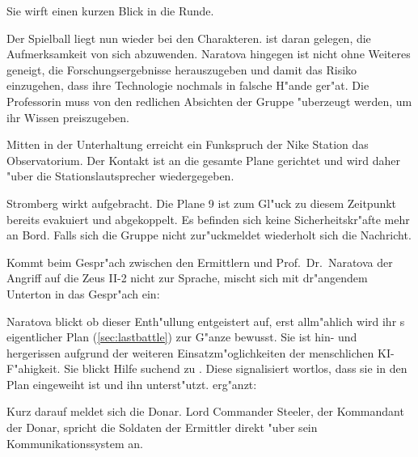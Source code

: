 Sie wirft einen kurzen Blick in die Runde.


Der Spielball liegt nun wieder bei den Charakteren. \xl{} ist daran gelegen, die Aufmerksamkeit von sich abzuwenden. Naratova hingegen ist nicht ohne Weiteres geneigt, die Forschungsergebnisse herauszugeben und damit das Risiko einzugehen, dass ihre Technologie nochmals in falsche H"ande ger"at. Die Professorin muss von den redlichen Absichten der Gruppe "uberzeugt werden, um ihr Wissen preiszugeben.

Mitten in der Unterhaltung erreicht ein Funkspruch der Nike Station das Observatorium. Der Kontakt ist an die gesamte Plane gerichtet und wird daher "uber die Stationslautsprecher wiedergegeben.


Stromberg wirkt aufgebracht. Die Plane 9 ist zum Gl"uck zu diesem Zeitpunkt bereits evakuiert und abgekoppelt. Es befinden sich keine Sicherheitskr"afte mehr an Bord. Falls sich die Gruppe nicht zur"uckmeldet wiederholt sich die Nachricht. 

Kommt beim Gespr"ach zwischen den Ermittlern und Prof.~Dr.~Naratova der Angriff auf die Zeus II-2 nicht zur Sprache, mischt sich \xl{} mit dr"angendem Unterton in das Gespr"ach ein:


Naratova blickt ob dieser Enth"ullung entgeistert auf, erst allm"ahlich wird ihr \xl{}s eigentlicher Plan (\cref{sec:lastbattle}) zur G"anze bewusst. Sie ist hin- und hergerissen aufgrund der weiteren Einsatzm"oglichkeiten der menschlichen KI-F"ahigkeit. Sie blickt Hilfe suchend zu \ml{}. Diese signalisiert wortlos, dass sie in den Plan eingeweiht ist und ihn unterst"utzt. \ml{} erg"anzt:


Kurz darauf meldet sich die Donar. Lord Commander Steeler, der Kommandant der Donar, spricht die Soldaten der Ermittler direkt "uber sein Kommunikationssystem an.

